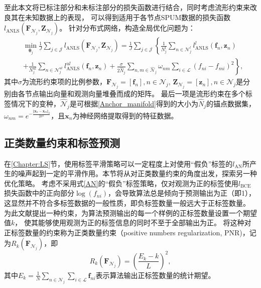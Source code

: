 至此本文将已标注部分和未标注部分的损失函数进行结合，同时考虑流形约束来改良其在未知数据上的表现，
可以得到适用于各节点SPUM数据的损失函数$l_{\mathrm{ANLS}}\left(\boldsymbol{F}_{\mathcal{N}_j}, \boldsymbol{Z}_{\mathcal{N}_j}\right)$。
针对分布式网络，构造全局优化问题为：
\begin{equation}
    \label{ANLS_min}
    \begin{split}
        &\min_{\boldsymbol\theta_j}\frac{1}{J}\sum_{j\in\mathcal{J}}
        l_{\mathrm{ANLS}}\left(\boldsymbol{F}_{\mathcal{N}_j}, \boldsymbol{Z}_{\mathcal{N}_j}\right) 
        =\frac{1}{J}\sum_{j\in\mathcal{J}} \left\{
        \frac{1}{N_j^l}\sum_{n \in \mathcal{N}_j^l}{l_{\mathrm{ANLS}}^l\left(\boldsymbol{f}_{n}, \boldsymbol{z}_{n}\right)} \right.\\
        &\left. +\frac{1}{N_j^{ul}}\sum_{n \in \mathcal{N}_j^{ul}}{l_{\mathrm{ANLS}}^{ul}\left(\boldsymbol{f}_{n}, \boldsymbol{z}_{n}\right)} 
        +\frac{\sigma}{2\hat{N}_j} \sum_{n,m \in \hat{\mathcal{N}}_j}{ \omega_{nm} \sum_{i \in \mathcal{L}}\left({f}_{ni}
        -{f}_{mi}\right)^2 } \right\},
    \end{split}
\end{equation}
其中$\sigma$为流形约束项的比例参数，$\boldsymbol{F}_{\mathcal{N}_j}=\left[\boldsymbol{f}_{n}\right], n \in \mathcal{N}_j$,
$\boldsymbol{Z}_{\mathcal{N}_j}=\left[\boldsymbol{z}_{n}\right], n \in \mathcal{N}_j$是分别由各节点输出向量和观测向量堆叠而成的矩阵。
最后一项是流形约束在多个标签情况下的变种，$\hat{\mathcal{N}}_j$是可根据\autoref{Anchor_manifold}得到的大小为$\hat{N}_j$的锚点数据集，
$\omega_{nm}=e^{-\frac{\Vert\boldsymbol x_n-\boldsymbol x_m\Vert_2}{2\sigma^2}}$，且$\boldsymbol x_n$为神经网络提取得到的特征数据。

\subsection{正类数量约束和标签预测}
在\ref{Chapter:LS}节，使用标签平滑策略可以一定程度上对使用“假负”标签的$l_{\mathrm{AN}}$所产生的噪声起到一定的平滑作用。本节将从对正类数量约束的角度出发，探索另一种优化策略。
考虑不采用式\eqref{AN}的“假负”标签策略，仅对观测为正的标签使用$l_{\mathrm{BCE}}$损失函数中的正向部分$\log \left(f_{n i}\right)$，会导致算法总是倾向于预测输出为正（即1），这显然并不符合多标签数据的一般性质，即负标签数量一般远大于正标签数量。
为此文献\parencite{Durand_EPR_2019}提出一种约束，为算法预测输出的每一个样例的正标签数量设置一个期望值$k$，
使其能够使用观测为正的标签信息的同时不至于全部输出为正。
将这种对正标签数量的约束称为正类数量约束（positive numbers regularization, PNR)，记为$R_k\left(\boldsymbol F_{\mathcal{N}_j}\right)$，即
\begin{equation}
    \label{R_k}
    R_k\left(\boldsymbol F_{\mathcal{N}_j}\right)=\left(\frac{E_k-k}{L}\right)^2,
\end{equation}
其中$E_k=\frac{1}{N}\sum_{n\in\mathcal{N}_j}\sum_{i\in\mathcal{L}}\boldsymbol f_{ni}$表示算法输出正标签数量的统计期望。

